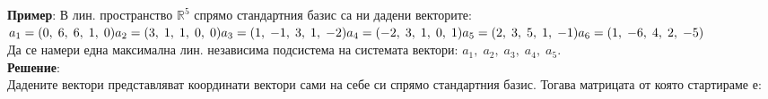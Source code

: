 \documentclass[12pt]{article}
\newcommand{\R}{\mathbb{R}}
\begin{document}
\textbf{Пример}: В лин. пространство $\R^5$ спрямо стандартния базис са ни дадени векторите: \\

$a_1 = (0, \; 6, \; 6, \; 1, \; 0) \\
a_2 = (3, \; 1, \; 1, \; 0, \; 0) \\
a_3 = (1, \; -1, \; 3, \; 1, \; -2) \\
a_4 = (-2, \; 3, \; 1, \; 0, \; 1) \\
a_5 = (2, \; 3, \; 5, \; 1, \; -1) \\
a_6 = (1, \; -6, \; 4, \; 2, \; -5)$ \\

Да се намери една максимална лин. независима подсистема на системата вектори: $a_1, \; a_2, \; a_3, \; a_4, \; a_5$. \\

\textbf{Решение}: \\

Дадените вектори представляват координати вектори сами на себе си спрямо стандартния базис.
Тогава матрицата от която стартираме е: \\
\end{document}
